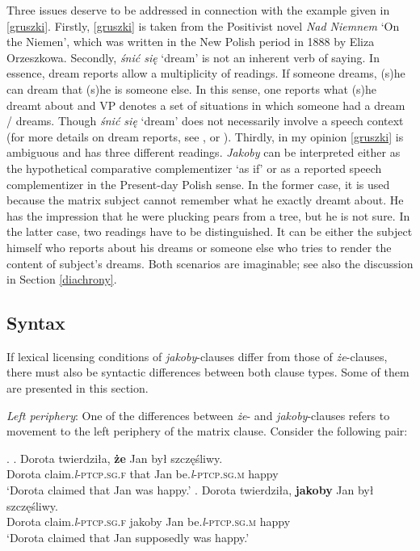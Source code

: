 \documentclass[output=paper
,modfonts
,nonflat]{langsci/langscibook}
\newcommand{\glossformat}[1]{\textsc{#1}}
\newcommand{\fem}{\glossformat{f}\xspace}
\newcommand{\lptcp}{\emph{l}\glossformat{-ptcp}\xspace}
\newcommand{\masc}{\glossformat{m}\xspace}
\newcommand{\sg}{\glossformat{sg}\xspace}
\begin{document}
Three issues deserve to be addressed in connection with the example given in \ref{gruszki}. Firstly, \ref{gruszki} is taken from the Positivist novel \emph{Nad Niemnem} `On the Niemen', which was written in the New Polish period in 1888 by Eliza Orzeszkowa. Secondly, \emph{śnić się} `dream' is not an inherent verb of saying. In essence, dream reports allow a multiplicity of readings. If someone dreams, (s)he can dream that (s)he is someone else. In this sense, one reports what (s)he dreamt about and VP denotes a set of situations in which someone had a dream / dreams. Though  \emph{śnić się} `dream' does not necessarily involve a speech context (for more details on dream reports, see \textcite{Shanon1980}, \textcite{Percus-Sauerland2003} or \textcite{Kauf2017}). Thirdly, in my opinion \ref{gruszki} is ambiguous and has three different readings. \emph{Jakoby} can be interpreted either as the hypothetical comparative complementizer `as if' or as a reported speech complementizer in the Present-day Polish sense. In the former case, it is used because the matrix subject cannot remember what he exactly dreamt about. He has the impression that he were plucking pears from a tree, but he is not sure. In the latter case, two readings have to be distinguished. It can be either the subject himself who reports about his dreams or someone else who tries to render the content of subject's dreams. Both scenarios are imaginable; see also the discussion in Section \ref{diachrony}.                    

\subsection{Syntax}

If lexical licensing conditions of \emph{jakoby}-clauses differ from those of \emph{że}-clauses, there must also be syntactic differences between both clause types. Some of them are presented in this section.  

\emph{Left periphery}: One of the differences between \emph{że}- and \emph{jakoby}-clauses refers to movement to the left periphery of the matrix clause. Consider the following pair:

\ex.	\ag.	Dorota twierdziła, \textbf{że} Jan był szczęśliwy. \\  
		Dorota claim.{\lptcp}.{\sg}.{\fem} that Jan be.{\lptcp}.{\sg}.{\masc} happy \\
		`Dorota claimed that Jan was happy.' 
	\bg.	Dorota twierdziła, \textbf{jakoby} Jan był szczęśliwy. \\  
		Dorota claim.{\lptcp}.{\sg}.{\fem} jakoby Jan be.{\lptcp}.{\sg}.{\masc} happy \\
		`Dorota claimed that Jan supposedly was happy.'
\end{document}
